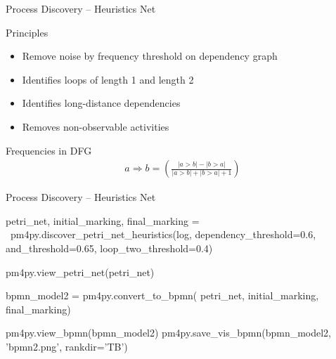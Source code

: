\documentclass[ignorenonframetext,xcolor=x11names]{beamer}
\begin{document}
\begin{frame}{Process Discovery -- Heuristics Net}
\begin{block}{Principles}
\begin{itemize}
   \item Remove noise by frequency threshold on dependency graph
   \item Identifies loops of length 1 and length 2
   \item Identifies long-distance dependencies
   \item Removes non-observable activities
\end{itemize}
\end{block}

\begin{block}{Frequencies in DFG}
\begin{align*}
a \Rightarrow b = \left( \frac{
| a > b| - |b > a|}{
| a > b| + |b > a| + 1}\right)
\end{align*}
\end{block}
\end{frame}

\begin{frame}[fragile]{Process Discovery -- Heuristics Net}
\footnotesize
\begin{pythoncode}
petri_net, initial_marking, final_marking = \
    pm4py.discover_petri_net_heuristics(log, 
        dependency_threshold=0.6,
        and_threshold=0.65,
        loop_two_threshold=0.4)
        
pm4py.view_petri_net(petri_net)
        
bpmn_model2 = pm4py.convert_to_bpmn(
    petri_net, initial_marking, final_marking)
    
pm4py.view_bpmn(bpmn_model2)
pm4py.save_vis_bpmn(bpmn_model2, 
    'bpmn2.png', rankdir='TB')
\end{pythoncode}
\end{frame}
\end{document}
